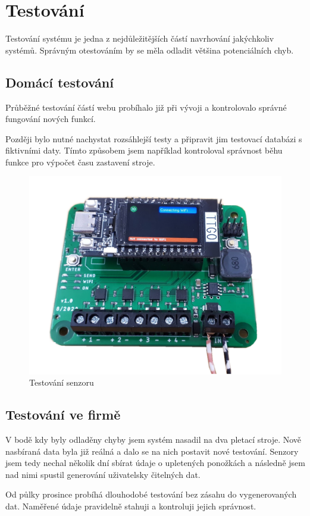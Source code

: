\chapter{Testování}
Testování systému je jedna z nejdůležitějších částí navrhování jakýchkoliv systémů.
Správným otestováním by se měla odladit většina potenciálních chyb.


\fxnote[author=JPA]{\textcolor{mygreen}{Měli bychom probrat tuto kapitolu}}


\section{Domácí testování}
Průběžné testování částí webu probíhalo již při vývoji a kontrolovalo správné fungování nových funkcí.

Později bylo nutné nachystat rozsáhlejší testy a připravit jim testovací databázi s fiktivními daty.
Tímto způsobem jsem například kontroloval správnost běhu funkce pro výpočet času zastavení stroje.

\begin{figure}[htbp]
    \centering
    \includegraphics[width=\textwidth]{img/Testovani.png}
    \caption{Testování senzoru}
    \label{fig:SenzorNaStroji}
\end{figure}

\section{Testování ve firmě}
V bodě kdy byly odladěny chyby jsem systém nasadil na dva pletací stroje.
Nově nasbíraná data byla již reálná a dalo se na nich postavit nové testování.
Senzory jsem tedy nechal několik dní sbírat údaje o upletených ponožkách a následně jsem nad nimi spustil generování uživatelsky čitelných dat.

Od půlky prosince probíhá dlouhodobé testování bez zásahu do vygenerovaných dat. Naměřené údaje pravidelně stahuji a kontroluji jejich správnost.

\newpage